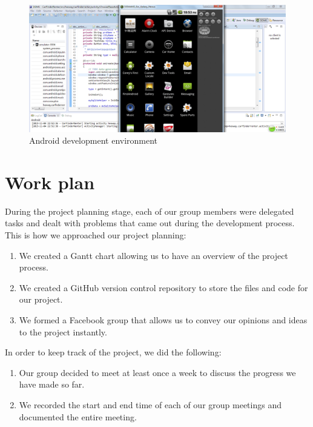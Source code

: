 \documentclass[10pt,a4paper,oneside]{report}
\begin{document}
\begin{figure}[H]
 \centering
 \includegraphics[keepaspectratio, width=\textwidth]{androiddev.png}
 \caption{Android development environment}
\end{figure}

\section*{Work plan}
During the project planning stage, each of our group members were delegated tasks and dealt with problems that came out during the development process.
This is how we approached our project planning:
\begin{enumerate}
\item{We created a Gantt chart allowing us to have an overview of the project process.}
\item{We created a GitHub version control repository to store the files and code for our project.}
\item{We formed a Facebook group that allows us to convey our opinions and ideas to the project instantly.}
\end{enumerate}
In order to keep track of the project, we did the following:
\begin{enumerate}
\item{Our group decided to meet at least once a week to discuss the progress we have made so far.}
\item{We recorded the start and end time of each of our group meetings and documented the entire meeting.}
\end{enumerate}
\end{document}
